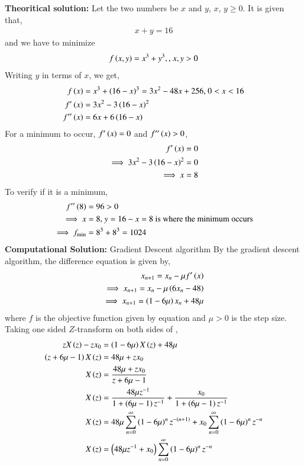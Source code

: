 \documentclass[journal]{IEEEtran}
\begin{document}
\textbf{Theoritical solution:}
\newline
Let the two numbers be $x$ and $y$, $x$, $y \geq 0$.
It is given that, 
\begin{align}
    x + y = 16
\end{align}
and we have to minimize
\begin{align}
    f\left(x, y\right) = x^3 + y^3, \text{, } x, y > 0
\end{align}
Writing $y$ in terms of $x$, we get,
\begin{align}
    f\left(x\right) &= x^3 + \left(16 - x\right)^3 = 3x^2 - 48x + 256\label{f} \text{, } 0 < x < 16\\
    f^{\prime}\left(x\right) &= 3x^2 - 3\left(16 - x\right)^2\\
    f^{\prime\prime}\left(x\right) &= 6x + 6\left(16 - x\right)
\end{align}
For a minimum to occur, $f^{\prime}\left(x\right) = 0$ and $f^{\prime\prime}\left(x\right) > 0$,
\begin{align}
    f^{\prime}\left(x\right) &= 0\\
    \implies 3x^2 - 3\left(16 - x\right)^2 &= 0\\
    \implies x &= 8
\end{align}
To verify if it is a minimum, 
\begin{align}
    f^{\prime\prime}\left(8\right) &= 96 > 0\\
    \implies x &= 8 \text{, } y = 16 - x = 8 \text{ is where the minimum occurs}\\
    \implies f_{\text{min}} &= 8^3 + 8^3 = 1024
\end{align}
\newline
\textbf{Computational Solution:} Gradient Descent algorithm
\newline
By the gradient descent algorithm, the difference equation is given by,
\begin{align}
    x_{n + 1} = x_n - \mu f^{\prime}\left(x\right)\\
    \implies x_{n + 1} = x_n - \mu \left(6x_n - 48\right)\\
    \implies x_{n + 1} = \left(1 - 6\mu\right)x_n + 48\mu \label{diff_eq}
\end{align}
where $f$ is the objective function given by equation \brak{\ref{f}} and $\mu > 0$ is the step size.
Taking one sided $Z$-transform on both sides of \brak{\ref{diff_eq}},
\begin{align}
    zX\left(z\right) - zx_0 &= \left(1 - 6\mu\right)X\left(z\right) + 48\mu\\
    \left(z + 6\mu - 1\right)X\left(z\right) &= 48\mu + zx_0\\
    X\left(z\right) &= \frac{48\mu + zx_0}{z + 6\mu - 1}\\
    X\left(z\right) &= \frac{48\mu z^{-1}}{1 + \left(6\mu - 1\right)z^{-1}} + \frac{x_0}{1 + \left(6\mu - 1\right)z^{-1}}\\
    X\left(z\right) &= 48\mu \sum_{n = 0}^{\infty} \left(1 - 6\mu\right)^{n} z^{-\left(n + 1\right)} + x_0\sum_{n = 0}^{\infty} \left(1 - 6\mu\right)^{n} z^{-n}\\
    X\left(z\right) &= \left(48\mu z^{-1} + x_0\right) \sum_{n = 0}^{\infty} \left(1 - 6\mu\right)^{n} z^{-n} \label{ztrans_eq}
\end{align}
\end{document}
